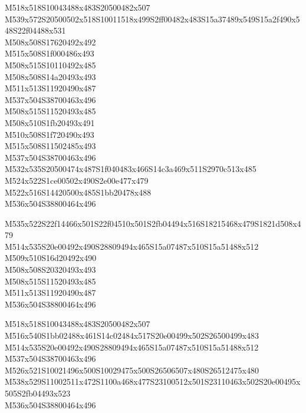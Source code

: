 \documentclass{article}
\begin{document}
\begin{multicols}{5}
\begin{center}

M518x518S10043488x483S20500482x507 %
\\M539x572S20500502x518S10011518x499S2ff00482x483S15a37489x549S15a2f490x548S22f04488x531 %
\\M508x508S17620492x492 %
\\M515x508S1f000486x493 %
\\M508x515S10110492x485 %
\\M508x508S14a20493x493 %
\\M511x513S11920490x487 %
\\M537x504S38700463x496 %
\\M508x515S11520493x485 %
\\M508x510S1fb20493x491 %
\\M510x508S1f720490x493 %
\\M515x508S11502485x493 %
\\M537x504S38700463x496 %
\\M532x535S20500474x487S1f040483x466S14c3a469x511S2970c513x485 %
\\M524x522S1ce00502x490S2e00e477x479 %
\\M522x516S14420500x485S1bb20478x488 %
\\M536x504S38800464x496 %

M535x522S22f14466x501S22f04510x501S2fb04494x516S18215468x479S1821d508x479 %
\\M514x535S20e00492x490S28809494x465S15a07487x510S15a51488x512 %
\\M509x510S16d20492x490 %
\\M508x508S20320493x493 %
\\M508x515S11520493x485 %
\\M511x513S11920490x487 %
\\M536x504S38800464x496 %

M518x518S10043488x483S20500482x507 %
\\M516x540S1bb02488x461S14c02484x517S20e00499x502S26500499x483 %
\\M514x535S20e00492x490S28809494x465S15a07487x510S15a51488x512 %
\\M537x504S38700463x496 %
\\M526x521S10021496x500S10029475x500S26506507x480S26512475x480 %
\\M538x529S11002511x472S1100a468x477S23100512x501S23110463x502S20e00495x505S2fb04493x523 %
\\M536x504S38800464x496 %


\end{center}
\end{multicols}
\end{document}
